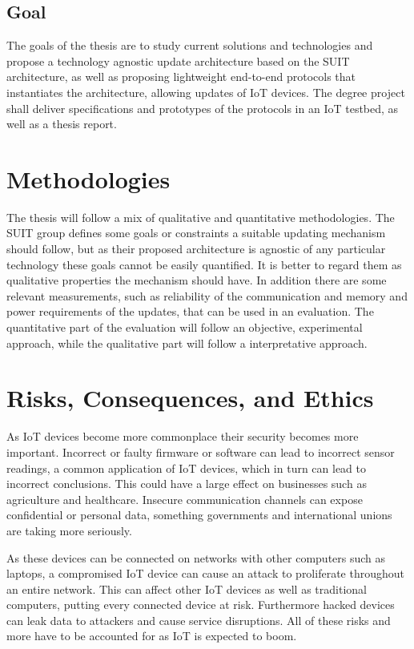 \documentclass[0-thesis.tex]{subfiles}
\begin{document}
\subsection{Goal}
The goals of the thesis are to study current solutions and technologies and propose a
technology agnostic update architecture based on the SUIT architecture, as well as
proposing lightweight end-to-end protocols that instantiates the architecture, allowing
updates of IoT devices. The degree project shall deliver specifications and prototypes of
the protocols in an IoT testbed, as well as a thesis report.

\section{Methodologies}
The thesis will follow a mix of qualitative and quantitative methodologies. The SUIT group
defines some goals or constraints a suitable updating mechanism should follow, but as
their proposed architecture is agnostic of any particular technology these goals cannot be
easily quantified. It is better to regard them as qualitative properties the mechanism
should have. In addition there are some relevant measurements, such as reliability of the
communication and memory and power requirements of the updates, that can be used in an
evaluation. The quantitative part of the evaluation will follow an objective, experimental
approach, while the qualitative part will follow a interpretative approach.

\section{Risks, Consequences, and Ethics}
As IoT devices become more commonplace their security becomes more important. Incorrect or
faulty firmware or software can lead to incorrect sensor readings, a common application of
IoT devices, which in turn can lead to incorrect conclusions. This could have a large
effect on businesses such as agriculture and healthcare. Insecure communication channels
can expose confidential or personal data, something governments and international unions
are taking more seriously. 

As these devices can be connected on networks with other computers such as laptops, a
compromised IoT device can cause an attack to proliferate throughout an entire network.
This can affect other IoT devices as well as traditional computers, putting every
connected device at risk. Furthermore hacked devices can leak data to attackers and cause
service disruptions. All of these risks and more have to be accounted for as IoT is
expected to boom.
\end{document}
